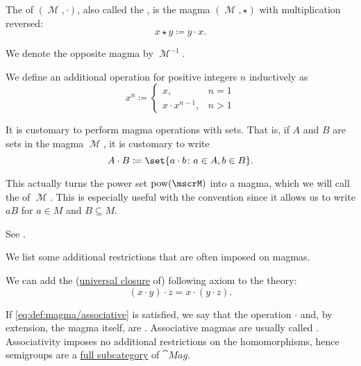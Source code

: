 \begin{definition}
\begin{thmenum}[series=def:magma]
     The  of \( (\mscrM, \cdot) \), also called the , is the magma \( (\mscrM, \star) \) with multiplication reversed:
    \begin{equation*}
      x \star y \coloneqq y \cdot x.
    \end{equation*}

    We denote the opposite magma by \( \mscrM^{-1} \).

     We define an additional  operation for positive integers \( n \) inductively as
    \begin{equation}\label{eq:def:magma/exponentiation}
      x^n \coloneqq \begin{cases}
        x,               & n = 1 \\
        x \cdot x^{n-1}, & n > 1
      \end{cases}
    \end{equation}

     It is customary to perform magma operations with sets. That is, if \( A \) and \( B \) are sets in the magma \( \mscrM \), it is customary to write
    \begin{equation*}
      A \cdot B \coloneqq \set{ a \cdot b \colon a \in A, b \in B }.
    \end{equation*}

    This actually turns the power set \( \pow(\mscrM) \) into a magma, which we will call the  of \( \mscrM \). This is especially useful with the convention  since it allows us to write \( aB \) for \( a \in M \) and \( B \subseteq M \).

    See .
  \end{thmenum}

  We list some additional restrictions that are often imposed on magmas.
  \begin{thmenum}[resume=def:magma]
     We can add the (\hyperref[thm:implicit_universal_quantification]{universal closure} of) following axiom to the theory:
    \begin{equation}\label{eq:def:magma/associative}
      (x \cdot y) \cdot z = x \cdot (y \cdot z).
    \end{equation}

    If \eqref{eq:def:magma/associative} is satisfied, we say that the operation \( \cdot \) and, by extension, the magma itself, are . Associative magmas are usually called . Associativity imposes no additional restrictions on the homomorphisms, hence semigroups are a \hyperref[def:subcategory]{full subcategory} of \( \cat{Mag} \).


\end{thmenum}
\end{definition}
